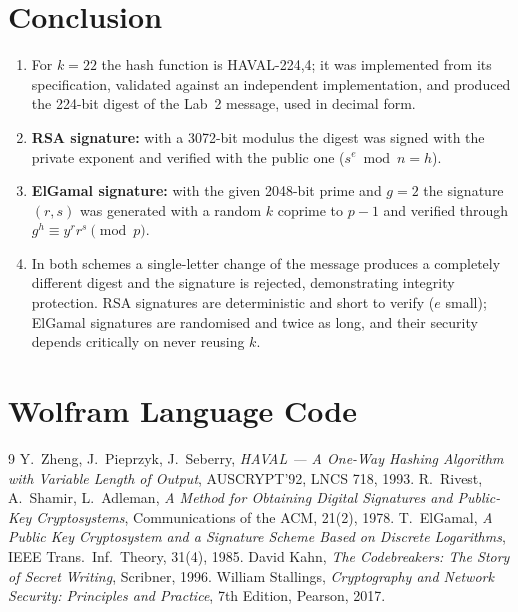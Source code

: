 \documentclass[12pt,a4paper]{article}
\begin{document}
\section{Conclusion}
\begin{enumerate}
  \item For $k = 22$ the hash function is HAVAL-224,4; it was implemented from its specification,
        validated against an independent implementation, and produced the 224-bit digest of the
        Lab~2 message, used in decimal form.
  \item \textbf{RSA signature:} with a 3072-bit modulus the digest was signed with the private
        exponent and verified with the public one ($s^{e} \bmod n = h$).
  \item \textbf{ElGamal signature:} with the given 2048-bit prime and $g=2$ the signature
        $(r,s)$ was generated with a random $k$ coprime to $p-1$ and verified through
        $g^{h} \equiv y^{r} r^{s} \pmod p$.
  \item In both schemes a single-letter change of the message produces a completely different
        digest and the signature is rejected, demonstrating integrity protection. RSA signatures
        are deterministic and short to verify ($e$ small); ElGamal signatures are randomised and
        twice as long, and their security depends critically on never reusing $k$.
\end{enumerate}

\appendix
\section{Wolfram Language Code}\label{app:wl}


\begin{thebibliography}{9}
 Y.\ Zheng, J.\ Pieprzyk, J.\ Seberry, \emph{HAVAL — A One-Way Hashing Algorithm
  with Variable Length of Output}, AUSCRYPT'92, LNCS 718, 1993.
 R.\ Rivest, A.\ Shamir, L.\ Adleman, \emph{A Method for Obtaining Digital Signatures
  and Public-Key Cryptosystems}, Communications of the ACM, 21(2), 1978.
 T.\ ElGamal, \emph{A Public Key Cryptosystem and a Signature Scheme Based on Discrete
  Logarithms}, IEEE Trans.\ Inf.\ Theory, 31(4), 1985.
 David Kahn, \emph{The Codebreakers: The Story of Secret Writing}, Scribner, 1996.
 William Stallings, \emph{Cryptography and Network Security: Principles and
  Practice}, 7th Edition, Pearson, 2017.
\end{thebibliography}
\end{document}
